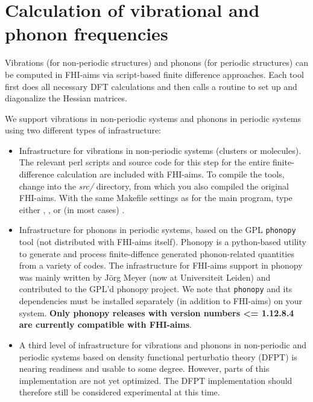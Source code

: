 \section{Calculation of vibrational and phonon frequencies}
\label{Sec:vib}

Vibrations (for non-periodic structures) and phonons (for periodic
structures) can be computed in FHI-aims via script-based finite
difference approaches. Each tool first does all necessary DFT
calculations and then calls a routine to set up and diagonalize the
Hessian matrices. 

We support vibrations in non-periodic systems and phonons in periodic
systems using two different types of infrastructure:
\begin{itemize}
  \item Infrastructure for vibrations in non-periodic systems
    (clusters or molecules). The relevant perl scripts and source code
    for this step for the entire finite-difference calculation are
    included with FHI-aims. To compile the tools, change into the
    \emph{src/} directory, from which you also compiled the original
    FHI-aims. With the same Makefile settings as for the main program,
    type either , , or (in most cases) .
  \item Infrastructure for phonons in periodic systems, based on the GPL
    \texttt{phonopy} tool (not distributed with FHI-aims
    itself). Phonopy is a python-based utility to generate and process
    finite-diffence generated phonon-related quantities from a variety
    of codes. The infrastructure for FHI-aims support in phonopy was
    mainly written by J\"org Meyer (now at Universiteit Leiden) and
    contributed to the GPL'd phonopy project. We note that 
    \texttt{phonopy} and its dependencies must be installed separately
    (in addition to FHI-aims) on your system. \textbf{Only phonopy releases
    with version numbers <= 1.12.8.4 are currently compatible with FHI-aims}.
  \item A third level of infrastructure for vibrations and phonons in
    non-periodic and periodic systems based on density functional
    perturbatio theory (DFPT) is nearing readiness and usable to some
    degree. However, parts of this implementation are not yet
    optimized. The DFPT implementation should therefore still be
    considered experimental at this time. 
\end{itemize}


